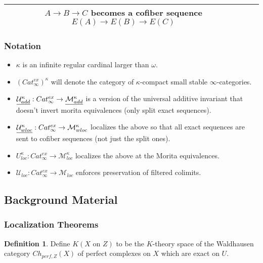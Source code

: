 \documentclass[letterpaper]{article}
\theoremstyle{definition}
\newtheorem{definition}[lemma]{Definition}
\newcommand{\mc}{\mathcal}
\begin{document}
\begin{tabulary}{0.9\textwidth}{|C|C|C|}
                                                                $A
                                                                \rightarrow
                                                                B
                                                                \rightarrow
                                                                C$
                                                                becomes
                                                                a
                                                                cofiber
                                                                sequence
                                                                $E(A) \rightarrow E(B) \rightarrow E(C)$\\
\hline
\end{tabulary}
\subsubsection{Notation}
\begin{itemize}
\item $\kappa$ is an infinite regular cardinal larger than $\omega$.
\item $(Cat_\infty^{ex})^\kappa$ will denote the category of
  $\kappa$-compact small stable $\infty$-categories.
\item $\uline{\mc U_{add}^\kappa} : Cat_\infty^{ex} \rightarrow
  \uline{\mc M^\kappa_{add}}$ is a version of the universal additive
  invariant that doesn't invert morita equivalences (only split exact
  sequences).
\item $\uline{\mc U^\kappa_{wloc}} : Cat_\infty^{ex} \rightarrow \mc
    M^\kappa_{wloc}$ localizes the above so that all exact sequences
    are sent to cofiber sequences (not
    just the split ones).
\item $U^\kappa_{loc} : Cat_\infty^{ex} \rightarrow \mc
  M^\kappa_{loc}$ localizes the above at the Morita equivalences.
\item $\mc U_{loc} : Cat^{ex}_\infty \rightarrow \mc M_{loc}$ enforces
  preservation of filtered colimits.
\end{itemize}
\subsection{Background Material}

\subsubsection{Localization Theorems}
\begin{definition}
Define $K(X \text{ on } Z)$ to be the $K$-theory space of the
Waldhausen category $Ch_{perf,Z}(X)$ of perfect complexes on $X$ which
are exact on $U$. 
\end{definition}
\end{document}
